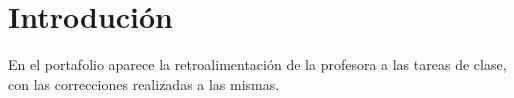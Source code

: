 \documentclass{article}
\begin{document}


\section{Introdución}

En el portafolio aparece la retroalimentación de la profesora a las tareas de clase, con las correcciones realizadas a las mismas.












\end{document}

